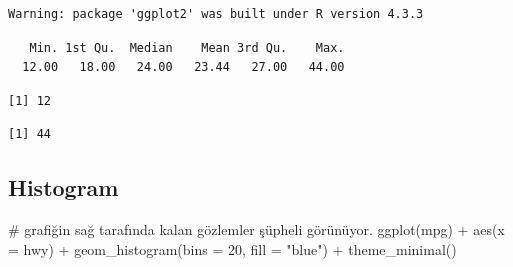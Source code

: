 \documentclass[
  letterpaper,
  DIV=11,
  numbers=noendperiod]{scrreprt}
\newenvironment{Shaded}{\begin{snugshade}}{\end{snugshade}}
\newcommand{\AttributeTok}[1]{\textcolor[rgb]{0.40,0.45,0.13}{#1}}
\newcommand{\CommentTok}[1]{\textcolor[rgb]{0.37,0.37,0.37}{#1}}
\newcommand{\DecValTok}[1]{\textcolor[rgb]{0.68,0.00,0.00}{#1}}
\newcommand{\FunctionTok}[1]{\textcolor[rgb]{0.28,0.35,0.67}{#1}}
\newcommand{\NormalTok}[1]{\textcolor[rgb]{0.00,0.23,0.31}{#1}}
\newcommand{\SpecialCharTok}[1]{\textcolor[rgb]{0.37,0.37,0.37}{#1}}
\newcommand{\StringTok}[1]{\textcolor[rgb]{0.13,0.47,0.30}{#1}}
\begin{document}
\begin{verbatim}
Warning: package 'ggplot2' was built under R version 4.3.3
\end{verbatim}

\begin{Shaded}
\end{Shaded}

\begin{verbatim}
   Min. 1st Qu.  Median    Mean 3rd Qu.    Max. 
  12.00   18.00   24.00   23.44   27.00   44.00 
\end{verbatim}

\begin{Shaded}
\end{Shaded}

\begin{verbatim}
[1] 12
\end{verbatim}

\begin{Shaded}
\end{Shaded}

\begin{verbatim}
[1] 44
\end{verbatim}

\subsection*{Histogram}\label{histogram}

\begin{Shaded}
\begin{Highlighting}[]
\CommentTok{\# grafiğin sağ tarafında kalan gözlemler şüpheli görünüyor.}
\FunctionTok{ggplot}\NormalTok{(mpg) }\SpecialCharTok{+}
  \FunctionTok{aes}\NormalTok{(}\AttributeTok{x =}\NormalTok{ hwy) }\SpecialCharTok{+}
  \FunctionTok{geom\_histogram}\NormalTok{(}\AttributeTok{bins =} \DecValTok{20}\NormalTok{, }\AttributeTok{fill =} \StringTok{"blue"}\NormalTok{) }\SpecialCharTok{+}
  \FunctionTok{theme\_minimal}\NormalTok{()}
\end{Highlighting}
\end{Shaded}
\end{document}
